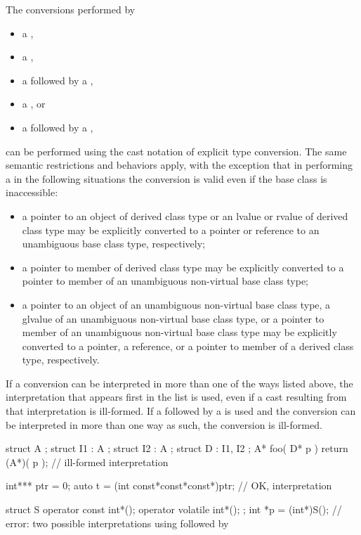 \pnum
The conversions performed by
\begin{itemize}
%
%
%
\item a ,
\item a ,
\item a  followed by a ,
\item a , or
\item a  followed by a ,
\end{itemize}
can be performed using the cast notation of explicit type conversion.
The same semantic restrictions and behaviors apply, with the exception
that in performing a  in the following situations the
conversion is valid even if the base class is inaccessible:
\begin{itemize}
\item a pointer to an object of derived class type or an lvalue or
rvalue of derived class type may be explicitly converted to a pointer or
reference to an unambiguous base class type, respectively;

\item a pointer to member of derived class type may be explicitly
converted to a pointer to member of an unambiguous non-virtual base
class type;

\item a pointer to an object of an unambiguous non-virtual base class
type, a glvalue of an unambiguous non-virtual base class type,
or a pointer to member of an unambiguous non-virtual base class type may
be explicitly converted to a pointer, a reference, or a pointer to
member of a derived class type, respectively.
\end{itemize}

If a conversion can be interpreted in more than one of the ways listed
above, the interpretation that appears first in the list is used, even
if a cast resulting from that interpretation is ill-formed. If a
 followed by a  is used and
the conversion can be interpreted in more than one way as such,
the conversion is
ill-formed.
\begin{example}
\begin{codeblock}
struct A { };
struct I1 : A { };
struct I2 : A { };
struct D : I1, I2 { };
A* foo( D* p ) {
  return (A*)( p );             // ill-formed  interpretation
}

int*** ptr = 0;
auto t = (int const*const*const*)ptr;   // OK,  interpretation

struct S {
  operator const int*();
  operator volatile int*();
};
int *p = (int*)S();     // error: two possible interpretations using  followed by 
\end{codeblock}
\end{example}

